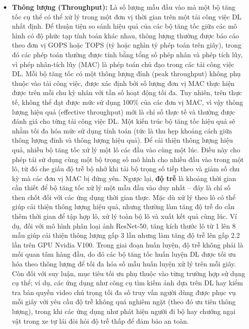 \documentclass[a4paper]{article}
\begin{document}
\begin{itemize}
    \item \textbf{Thông lượng (Throughput):} Là số lượng mẫu đầu vào mà một bộ tăng tốc cụ thể có thể xử lý trong một đơn vị thời gian trên một tải công việc DL nhất định. Để thuận tiện so sánh hiệu quả của các bộ tăng tốc giữa các mô hình có độ phức tạp tính toán khác nhau, thông lượng thường được báo cáo theo đơn vị GOPS hoặc TOPS (tỷ hoặc nghìn tỷ phép toán trên giây), trong đó các phép toán thường được tính bằng tổng số phép nhân và phép tích lũy, vì phép nhân-tích lũy (MAC) là phép toán chủ đạo trong các tải công việc DL. Mỗi bộ tăng tốc có một thông lượng đỉnh (peak throughput) không phụ thuộc vào tải công việc, được xác định bởi số lượng đơn vị MAC thực hiện được trên mỗi chu kỳ nhân với tần số hoạt động tối đa. Tuy nhiên, trên thực tế, không thể đạt được mức sử dụng 100\% của các đơn vị MAC, vì vậy thông lượng hiệu quả (effective throughput) mới là chỉ số thực tế và thường được đánh giá cho từng tải công việc DL. Một kiến trúc bộ tăng tốc hiệu quả sẽ nhằm tối đa hóa mức sử dụng tính toán (tức là thu hẹp khoảng cách giữa thông lượng đỉnh và thông lượng hiệu quả). Để cải thiện thông lượng hiệu quả, nhiều bộ tăng tốc xử lý một lô các đầu vào cùng một lúc. Điều này cho phép tái sử dụng cùng một bộ trọng số mô hình cho nhiều đầu vào trong một lô, từ đó che giấu độ trễ bộ nhớ khi tải bộ trọng số tiếp theo và giảm số chu kỳ mà các đơn vị MAC bị đứng yên. Ngược lại, \textbf{độ trễ} là khoảng thời gian cần thiết để bộ tăng tốc xử lý một mẫu đầu vào duy nhất – đây là chỉ số then chốt đối với các ứng dụng thời gian thực. Mặc dù xử lý theo lô có thể giúp cải thiện thông lượng hiệu quả, nhưng thường làm tăng độ trễ do cần thêm thời gian để tập hợp lô, xử lý toàn bộ lô và xuất kết quả cùng lúc. Ví dụ, đối với mô hình phân loại ảnh ResNet-50, tăng kích thước lô từ 1 lên 8 mẫu giúp cải thiện thông lượng gấp 3 lần nhưng làm tăng độ trễ lên gấp 2.2 lần trên GPU Nvidia V100. Trong giai đoạn huấn luyện, độ trễ không phải là mối quan tâm hàng đầu, do đó các bộ tăng tốc huấn luyện DL được tối ưu hóa theo thông lượng để tối đa hóa số mẫu huấn luyện xử lý trên mỗi giây. Còn đối với suy luận, mục tiêu tối ưu phụ thuộc vào từng trường hợp sử dụng cụ thể; ví dụ, các ứng dụng như công cụ tìm kiếm ảnh dựa trên DL hay kiểm tra bản quyền video chú trọng tối đa số truy vấn người dùng được phục vụ mỗi giây với yêu cầu độ trễ không quá nghiêm ngặt (theo đó ưu tiên thông lượng), trong khi các ứng dụng như phát hiện người đi bộ hay chướng ngại vật trong xe tự lái đòi hỏi độ trễ thấp để đảm bảo an toàn.
\end{itemize}
\end{document}
